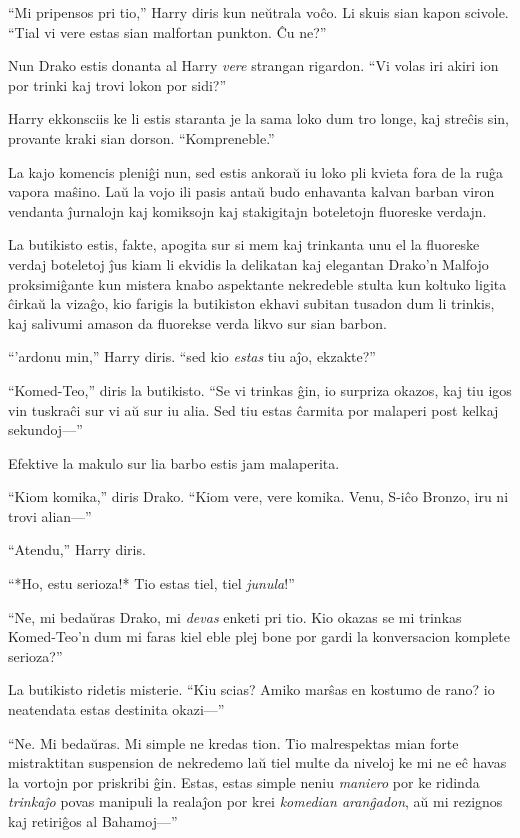 ``Mi pripensos pri tio,'' Harry diris kun neŭtrala voĉo. Li skuis sian
kapon scivole. ``Tial vi vere estas sian malfortan punkton. Ĉu ne?''

Nun Drako estis donanta al Harry \emph{vere} strangan rigardon. ``Vi
volas iri akiri ion por trinki kaj trovi lokon por sidi?''

Harry ekkonsciis ke li estis staranta je la sama loko dum tro longe,
kaj streĉis sin, provante kraki sian dorson. ``Kompreneble.''

La kajo komencis pleniĝi nun, sed estis ankoraŭ iu loko pli kvieta
fora de la ruĝa vapora maŝino. Laŭ la vojo ili pasis antaŭ budo
enhavanta kalvan barban viron vendanta ĵurnalojn kaj komiksojn kaj
stakigitajn boteletojn fluoreske verdajn.

La butikisto estis, fakte, apogita sur si mem kaj trinkanta unu el la
fluoreske verdaj boteletoj ĵus kiam li ekvidis la delikatan kaj
elegantan Drako'n Malfojo proksimiĝante kun mistera knabo aspektante
nekredeble stulta kun koltuko ligita ĉirkaŭ la vizaĝo, kio farigis la
butikiston ekhavi subitan tusadon dum li trinkis, kaj salivumi amason
da fluorekse verda likvo sur sian barbon.

``'ardonu min,'' Harry diris. ``sed kio \emph{estas} tiu aĵo, ekzakte?''

``Komed-Teo,'' diris la butikisto. ``Se vi trinkas ĝin, io surpriza
okazos, kaj tiu igos vin tuskraĉi sur vi aŭ sur iu alia. Sed tiu estas
ĉarmita por malaperi post kelkaj sekundoj—''

Efektive la makulo sur lia barbo estis jam malaperita.

``Kiom komika,'' diris Drako. ``Kiom vere, vere komika. Venu, S-iĉo
Bronzo, iru ni trovi alian—''

``Atendu,'' Harry diris.

``*Ho, estu serioza!* Tio estas tiel, tiel \emph{junula}!''

``Ne, mi bedaŭras Drako, mi \emph{devas} enketi pri tio. Kio okazas se
mi trinkas Komed-Teo'n dum mi faras kiel eble plej bone por gardi la
konversacion komplete serioza?''

La butikisto ridetis misterie. ``Kiu scias? Amiko marŝas en kostumo de
rano? io neatendata estas destinita okazi—''

``Ne. Mi bedaŭras. Mi simple ne kredas tion. Tio malrespektas mian
forte mistraktitan suspension de nekredemo laŭ tiel multe da niveloj ke
mi ne eĉ havas la vortojn por priskribi ĝin. Estas, estas simple
neniu \emph{maniero} por ke ridinda \emph{trinkaĵo} povas manipuli la
realaĵon por krei \emph{komedian aranĝadon}, aŭ mi rezignos
kaj retiriĝos al Bahamoj—''

